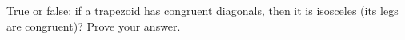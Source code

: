 True or false: if a trapezoid has congruent diagonals, then it is isosceles (its legs are congruent)? Prove your answer.
